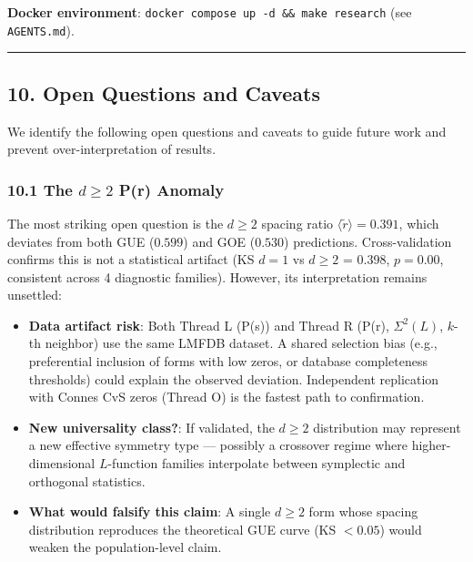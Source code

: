 \documentclass[
]{article}
\providecommand{\tightlist}{%
  \setlength{\itemsep}{0pt}\setlength{\parskip}{0pt}}
\begin{document}
\textbf{Docker environment}:
\texttt{docker\ compose\ up\ -d\ \&\&\ make\ research} (see
\texttt{AGENTS.md}).

\begin{center}\rule{0.5\linewidth}{0.5pt}\end{center}

\hypertarget{open-questions-and-caveats}{%
\subsection{10. Open Questions and
Caveats}\label{open-questions-and-caveats}}

We identify the following open questions and caveats to guide future
work and prevent over-interpretation of results.

\hypertarget{the-dge-2-pr-anomaly}{%
\subsubsection{\texorpdfstring{10.1 The \(d\ge 2\) P(r)
Anomaly}{10.1 The d\textbackslash ge 2 P(r) Anomaly}}\label{the-dge-2-pr-anomaly}}

The most striking open question is the \(d\ge 2\) spacing ratio
\(\langle\tilde{r}\rangle = 0.391\), which deviates from both GUE
(\(0.599\)) and GOE (\(0.530\)) predictions. Cross-validation confirms
this is not a statistical artifact (KS \(d=1\) vs \(d\ge 2\) = 0.398,
\(p = 0.00\), consistent across 4 diagnostic families). However, its
interpretation remains unsettled:

\begin{itemize}
\tightlist
\item
  \textbf{Data artifact risk}: Both Thread L (P(s)) and Thread R (P(r),
  \(\Sigma^2(L)\), \(k\)-th neighbor) use the same LMFDB dataset. A
  shared selection bias (e.g., preferential inclusion of forms with low
  zeros, or database completeness thresholds) could explain the observed
  deviation. Independent replication with Connes CvS zeros (Thread O) is
  the fastest path to confirmation.
\item
  \textbf{New universality class?}: If validated, the \(d\ge 2\)
  distribution may represent a new effective symmetry type --- possibly
  a crossover regime where higher-dimensional \(L\)-function families
  interpolate between symplectic and orthogonal statistics.
\item
  \textbf{What would falsify this claim}: A single \(d\ge 2\) form whose
  spacing distribution reproduces the theoretical GUE curve (KS
  \(< 0.05\)) would weaken the population-level claim.
\end{itemize}
\end{document}
